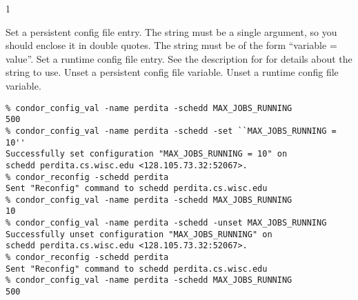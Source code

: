 \begin{ManPage}{\label{man-condor-config-val}}{1}
\begin{Options}
	 { Set a persistent
	config file entry.
	The string must be a single argument, so you should enclose it
	in double quotes.
	The string must be of the form ``variable = value''. }
	 { Set a runtime
	config file entry.
	See the description for  for details about the
	string to use. } 
	 { Unset a persistent
	config file variable. }
	 { Unset a runtime
	config file variable. }
\end{Options}

\Examples

\begin{verbatim}
% condor_config_val -name perdita -schedd MAX_JOBS_RUNNING
500
% condor_config_val -name perdita -schedd -set ``MAX_JOBS_RUNNING = 10''
Successfully set configuration "MAX_JOBS_RUNNING = 10" on 
schedd perdita.cs.wisc.edu <128.105.73.32:52067>.
% condor_reconfig -schedd perdita
Sent "Reconfig" command to schedd perdita.cs.wisc.edu
% condor_config_val -name perdita -schedd MAX_JOBS_RUNNING
10
% condor_config_val -name perdita -schedd -unset MAX_JOBS_RUNNING
Successfully unset configuration "MAX_JOBS_RUNNING" on 
schedd perdita.cs.wisc.edu <128.105.73.32:52067>.
% condor_reconfig -schedd perdita
Sent "Reconfig" command to schedd perdita.cs.wisc.edu
% condor_config_val -name perdita -schedd MAX_JOBS_RUNNING
500
\end{verbatim}

\end{ManPage}
